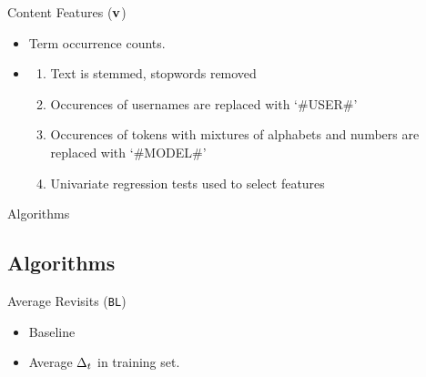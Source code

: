 \documentclass[12pt]{../presentation}
\begin{document}
	\begin{frame}{Content Features ($\mathbf{v}$)}
	\begin{itemize}
		\item Term occurrence counts.
		\item
		\begin{enumerate}
			\item Text is stemmed, stopwords removed
			\item Occurences of usernames are replaced with `\#USER\#'
			\item Occurences of tokens with mixtures of alphabets and numbers are 
				replaced with `\#MODEL\#'
			\item Univariate regression tests used to select features
		\end{enumerate}
	\end{itemize}
 

	\end{frame}
\begin{frame}
	\huge Algorithms
\end{frame}
\subsection{Algorithms}
	\begin{frame}{Average Revisits (\texttt{BL})}
		\begin{itemize}
			\item Baseline
			\item Average $\Delta_t$ in training set.
		\end{itemize}
	\end{frame}
\end{document}
